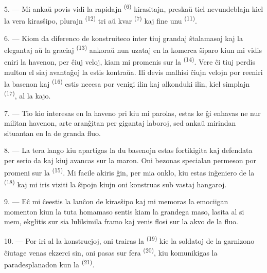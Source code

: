5. --- Mi ankaŭ povis vidi la rapidajn  \textsuperscript{(6)}
kirasitajn, preskaŭ tiel nevundeblajn kiel la vera kirasŝipo, plurajn
 \textsuperscript{(12)} tri aŭ kvar 
\textsuperscript{(7)} kaj fine unu  \textsuperscript{(11)}.

6. --- Kiom da diferenco de konstruiteco inter tiuj grandaj ŝtalamasoj kaj la
elegantaj  aŭ la graciaj 
\textsuperscript{(13)} ankoraŭ nun uzataj en la komerca ŝiparo kiun mi vidis
eniri la havenon, per ĉiuj veloj, kiam mi promenis sur la 
\textsuperscript{(14)}. Vere ĉi tiuj perdis multon el siaj avantaĝoj
 la  estis kontraŭa. Ili devis malhisi ĉiujn velojn
por reeniri la basenon kaj  \textsuperscript{(16)} estis
necesa por venigi ilin kaj alkonduki ilin, kiel simplajn 
\textsuperscript{(17)}, al la kajo.

\VUsaut{3.0mm}
\VUsaut{3.0mm}

7. --- Tio kio interesas en la haveno pri kiu mi parolas, estas ke ĝi enhavas ne
nur militan havenon, arte aranĝitan per gigantaj laboroj, sed ankaŭ mirindan
 situantan en la  de granda fluo.

8. --- La tera lango kiu apartigas la du basenojn estas fortikigita kaj
defendata per serio da  kaj  kiuj avancas
sur la maron. Oni bezonas specialan permeson por promeni sur la
 \textsuperscript{(15)}. Mi facile akiris ĝin, per mia onklo,
kiu estas inĝeniero de la  \textsuperscript{(18)} kaj mi
iris viziti la ŝipojn kiujn oni konstruas sub vastaj hangaroj.

9. --- Eĉ mi ĉeestis la lanĉon de kirasŝipo kaj mi memoras la emociigan
momenton kiun la tuta homamaso sentis kiam la grandega maso, lasita al si mem,
ekglitis sur sia lulilsimila framo kaj venis flosi sur la akvo de la fluo.

10. --- Por iri al la konstruejoj, oni trairas la 
\textsuperscript{(19)} kie la soldatoj de la garnizono ĉiutage venas ekzerci
sin, oni pasas sur fera  \textsuperscript{(20)}, kiu
komunikigas la paradesplanadon kun la  \textsuperscript{(21)}.

